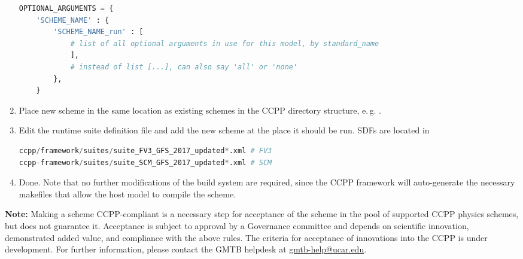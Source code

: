 \begin{enumerate}
\begin{lstlisting}[language=Python]
OPTIONAL_ARGUMENTS = {
    'SCHEME_NAME' : {
        'SCHEME_NAME_run' : [
            # list of all optional arguments in use for this model, by standard_name
            ],
            # instead of list [...], can also say 'all' or 'none'
        },
    }
\end{lstlisting}
\item Place new scheme in the same location as existing schemes in the CCPP directory structure, e.\,g. .
\item Edit the runtime suite definition file and add the new scheme at the place it should be run. SDFs are located in
\begin{lstlisting}[language=Python]
ccpp/framework/suites/suite_FV3_GFS_2017_updated*.xml # FV3
ccpp-framework/suites/suite_SCM_GFS_2017_updated*.xml # SCM
\end{lstlisting}
\item Done. Note that no further modifications of the build system are required, since the CCPP framework will auto-generate the necessary makefiles that allow the host model to compile the scheme.
\end{enumerate}
\textbf{Note:} Making a scheme CCPP-compliant is a necessary step for acceptance of the scheme in the pool of supported CCPP physics schemes, but does not guarantee it. Acceptance is subject to approval by a Governance committee and depends on scientific innovation, demonstrated added value, and compliance with the above rules. The criteria for acceptance of innovations into the CCPP is under development. For further information, please contact the GMTB helpdesk at \url{gmtb-help@ucar.edu}.
